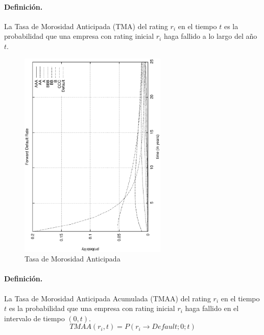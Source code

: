 \paragraph{Definici\'on.} La Tasa de Morosidad Anticipada (TMA) 
del rating $r_i$ en el tiempo $t$ es la probabilidad que una empresa con rating 
inicial $r_i$ haga fallido a lo largo del a\~no $t$.

\begin{figure}[!hb]
\begin{center}
\includegraphics[height=10cm, angle=-90]{./images/tma.ps}
\caption{Tasa de Morosidad Anticipada}
\label{tma}
\end{center}
\end{figure}

\paragraph{Definici\'on.} La Tasa de Morosidad Anticipada Acumulada (TMAA) 
del rating $r_i$ en el tiempo $t$ es la probabilidad que una empresa con rating 
inicial $r_i$ haga fallido en el intervalo de tiempo $(0,t)$.
\begin{displaymath}
TMAA(r_i,t)=P(r_i \to Default;0;t)
\end{displaymath}

